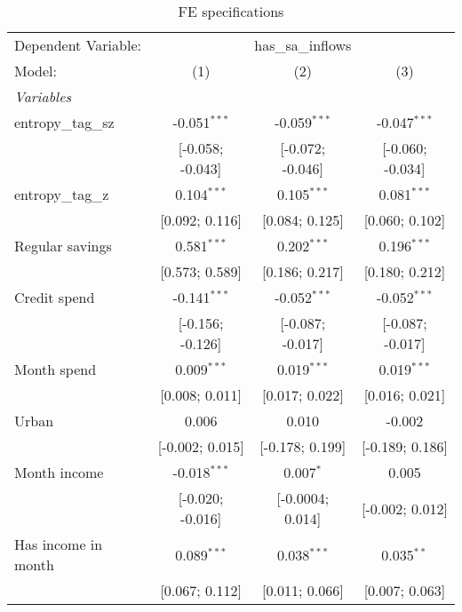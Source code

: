 
\begin{table}[htbp]
   \centering
   \footnotesize
   \begin{threeparttable}[b]
      \caption{\label{tab:reg_entropy_savings_fe} FE specifications}
      \begin{tabular}{lccc}
         \tabularnewline \midrule \midrule
         Dependent Variable: & \multicolumn{3}{c}{has\_sa\_inflows}\\
         Model:              & (1)              & (2)              & (3)\\  
         \midrule
         \emph{Variables}\\
         entropy\_tag\_sz    & -0.051$^{***}$   & -0.059$^{***}$   & -0.047$^{***}$\\   
                             & [-0.058; -0.043] & [-0.072; -0.046] & [-0.060; -0.034]\\   
         entropy\_tag\_z     & 0.104$^{***}$    & 0.105$^{***}$    & 0.081$^{***}$\\   
                             & [0.092; 0.116]   & [0.084; 0.125]   & [0.060; 0.102]\\   
         Regular savings     & 0.581$^{***}$    & 0.202$^{***}$    & 0.196$^{***}$\\   
                             & [0.573; 0.589]   & [0.186; 0.217]   & [0.180; 0.212]\\   
         Credit spend        & -0.141$^{***}$   & -0.052$^{***}$   & -0.052$^{***}$\\   
                             & [-0.156; -0.126] & [-0.087; -0.017] & [-0.087; -0.017]\\   
         Month spend         & 0.009$^{***}$    & 0.019$^{***}$    & 0.019$^{***}$\\   
                             & [0.008; 0.011]   & [0.017; 0.022]   & [0.016; 0.021]\\   
         Urban               & 0.006            & 0.010            & -0.002\\   
                             & [-0.002; 0.015]  & [-0.178; 0.199]  & [-0.189; 0.186]\\   
         Month income        & -0.018$^{***}$   & 0.007$^{*}$      & 0.005\\   
                             & [-0.020; -0.016] & [-0.0004; 0.014] & [-0.002; 0.012]\\   
         Has income in month & 0.089$^{***}$    & 0.038$^{***}$    & 0.035$^{**}$\\   
                             & [0.067; 0.112]   & [0.011; 0.066]   & [0.007; 0.063]\\   

\end{tabular}
\end{threeparttable}
\end{table}
